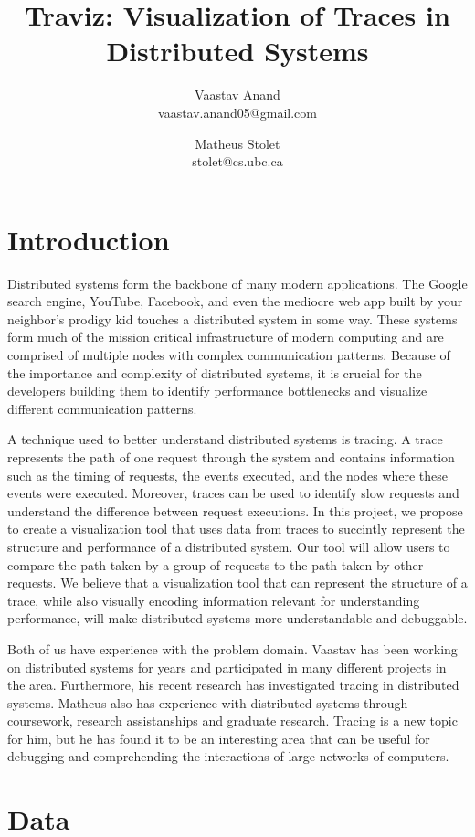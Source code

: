 \documentclass{article}
\title{Traviz: Visualization of Traces in Distributed Systems}
\author{Vaastav Anand \\ vaastav.anand05@gmail.com  \and Matheus Stolet \\ stolet@cs.ubc.ca}
\date{}
\begin{document}
\maketitle

\section{Introduction}

Distributed systems form the backbone of many modern applications. The Google search engine,
YouTube, Facebook, and even the mediocre web app built by your neighbor's prodigy kid touches
a distributed system in some way. These systems form much of the mission critical infrastructure
of modern computing and are comprised of multiple nodes with complex communication patterns. Because
of the importance and complexity of distributed systems, it is crucial for the developers building
them to identify performance bottlenecks and visualize different communication patterns. 

A technique used to better understand distributed systems is tracing. A trace represents the
path of one request through the system and contains information such as the timing of requests, 
the events executed, and the nodes where these events were executed. Moreover, traces can be used
to identify slow requests and understand the difference between request executions. In this project, we
propose to create a visualization tool that uses data from traces to succintly represent the structure 
and performance of a distributed system. Our tool will allow users to compare the path taken by a group
of requests to the path taken by other requests. We believe that a visualization tool that can represent the
structure of a trace, while also visually encoding information relevant for understanding performance,
will make distributed systems more understandable and debuggable.

Both of us have experience with the problem domain. Vaastav has been working on distributed systems for years
and participated in many different projects in the area. Furthermore, his recent research has investigated
tracing in distributed systems. Matheus also has experience with distributed systems through coursework,
research assistanships and graduate research. Tracing is a new topic for him, but he has found it to be
an interesting area that can be useful for debugging and comprehending the interactions of large networks
of computers.

\section{Data}
\end{document}
